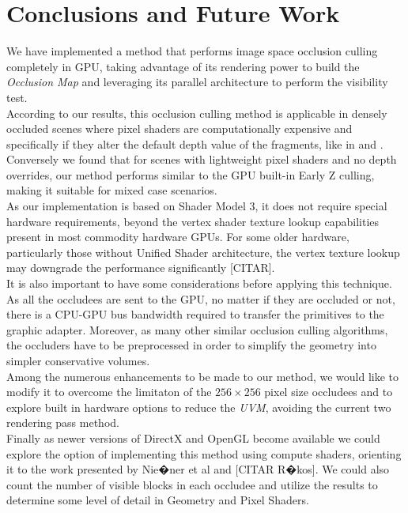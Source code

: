 \documentclass[10pt, conference]{IEEEtran}
\begin{document}
\section{Conclusions and Future Work}
%
We have implemented a method that performs image space occlusion culling completely in GPU, taking advantage of its rendering power to 
build the \emph{Occlusion Map} and leveraging its parallel architecture to perform the visibility test.\\

According to our results, this occlusion culling method is applicable in densely occluded scenes where pixel shaders are computationally 
expensive and specifically if they alter the default depth value of the fragments, like in \cite{z_correct_bump_1} and \cite{z_correct_bump_2}. 
Conversely we found that for scenes with lightweight pixel shaders and no depth overrides, our method performs similar to the GPU built-in Early Z 
culling, making it suitable for mixed case scenarios.\\

As our implementation is based on Shader Model 3, it does not require special hardware requirements, beyond the vertex shader texture lookup 
capabilities present in most commodity hardware GPUs. 
For some older hardware, particularly those without Unified Shader architecture, the vertex texture lookup may downgrade the performance 
significantly [CITAR].\\

It is also important to have some considerations before applying this technique. 
As all the occludees are sent to the GPU, no matter if they are occluded or not, there is a CPU-GPU bus bandwidth required to transfer the primitives to the graphic adapter.
Moreover, as many other similar occlusion culling algorithms, the occluders have to be preprocessed in order to simplify the geometry into simpler conservative volumes.\\
 
Among the numerous enhancements to be made to our method, we would like to modify it to overcome the limitaton of the 
$256 \times 256$ pixel size occludees and to explore built in hardware options to reduce the \emph{UVM}, avoiding the current two rendering pass method.\\

Finally as newer versions of DirectX and OpenGL become available we could explore the option of implementing this method using compute shaders, 
orienting it  to the work presented by Nie�ner et al \cite{occlusion_culling_tessellation} and [CITAR R�kos]. 
We could also count the number of visible blocks in each occludee and utilize the results to determine some level of detail in Geometry and Pixel Shaders.
\end{document}
